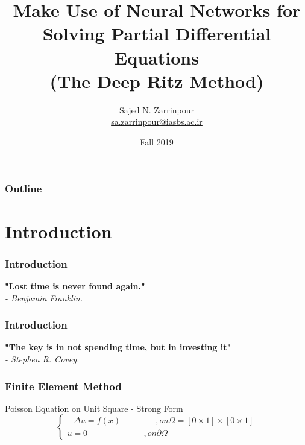 \documentclass{beamer}
\title[Make Use of NN for Solving PDEs]{
  Make Use of Neural Networks for Solving Partial Differential Equations\\(The Deep Ritz Method)}
\author[Sajed N. Zarrinpour]{
  Sajed N. Zarrinpour \\\medskip
  {\small \url{sa.zarrinpour@iasbs.ac.ir}} \\ 
  {\small \url{}}}
\institute[IASBS]{
  Institute for Advanced Studies in Basic Sciences}
\date[\today]{
  Fall 2019 }
\begin{document}
\begin{frame}
  \titlepage
\end{frame}

\begin{frame}
  \frametitle{Outline}

  \tableofcontents
\end{frame}

\section{Introduction}

\begin{frame}
  \frametitle{Introduction}

    \textbf{"Lost time is never found again."}\centering\\
  	\em - Benjamin Franklin.

	
\end{frame}
\begin{frame}
	\frametitle{Introduction}

	\textbf{"The key is in not spending time, but in investing it"}\centering\\
	\em - Stephen R. Covey. 
	
\end{frame}

\begin{frame}
  \frametitle{Finite Element Method}

  \begin{block}{Poisson Equation on Unit Square - Strong Form}
    \begin{equation*}
    	\begin{cases}
    	 -\Delta u = f (x)\hspace{50pt} ,on \Omega = [0\times 1] \times [0\times 1]  
    	 \\
    	 u = 0 \hspace{80pt} ,on \partial \Omega
    	\end{cases}	
    \end{equation*}
  \end{block}

\end{frame}
\end{document}
